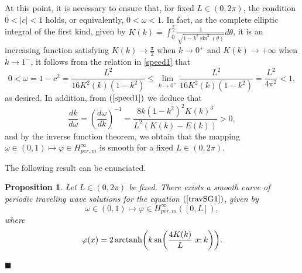 \documentclass[12pt,reqno,a4paper]{amsart} %
\newcommand{\sn}{{\rm \,sn}}
\numberwithin{equation}{section}
\numberwithin{figure}{section}
\newtheorem{proposition}[theorem]{Proposition}
\begin{document}
 \indent At this point, it is necessary to ensure that, for fixed $L\in (0,2\pi)$, the condition $0<|c|<1$ holds, or equivalently, $0<\omega< 1 $. In fact, as the complete elliptic integral of the first kind, given by $K(k)=\displaystyle\int_{0}^{\frac{\pi}{2}}\frac{1}{\sqrt{1-k^2\sin^2(\theta)}}d\theta $, it is an increasing function satisfying $K(k)\rightarrow \frac{\pi}{2}$ when $k\rightarrow 0^+$ and $K(k)\rightarrow +\infty$ when $k\rightarrow 1^-$, %
 it follows from the relation in \eqref{speed1}  that
 \begin{equation}\label{speed2}
 	0<\omega=1-c^2=\frac{L^2}{16K^2(k)(1-k^2)} \leq \lim_{k\rightarrow 0^+} \frac{L^2}{16K^2(k)(1-k^2)} =\frac{L^2}{4\pi^2}< 1, 
 \end{equation} 
 as desired. In addition, from $(\ref{speed1})$ we deduce that
 \begin{equation}\label{dk/dw}
 	 \frac{dk}{d\omega}=\left(\frac{d\omega}{dk}\right)^{-1}=\displaystyle\frac{8k(1-k^2)^2K(k)^3}{L^2(K(k)-E(k))}>0,
 \end{equation}
and by the inverse function theorem, we obtain that the mapping $\omega \in (0,1) \mapsto \varphi \in H_{per,m}^{\infty}$ is smooth for a fixed $L \in (0,2\pi)$.
 
 The following result can be enunciated.
 
 \begin{proposition}\label{prop.WS}
 	Let $L\in (0,2\pi)$ be fixed. There exists a smooth curve of periodic traveling wave solutions for the equation $(\ref{travSG1})$, given by
 	\begin{equation}
 		\displaystyle
 		\omega\in\left(0,1\right)
 		\mapsto \varphi\in H_{per,m}^\infty([0,L]),\label{curveeqSG1}\end{equation}
 	where
 	\begin{equation} 
 		\varphi(x)=2\operatorname{arctanh}\biggl(k \sn\biggl(\frac{4K(k)}{L} \ x ;k\biggl)\biggl).\label{existSG1}
 	\end{equation}  
 \end{proposition}
 \begin{flushright}
 	${\blacksquare}$
 \end{flushright}
 
 
 
\end{document}
